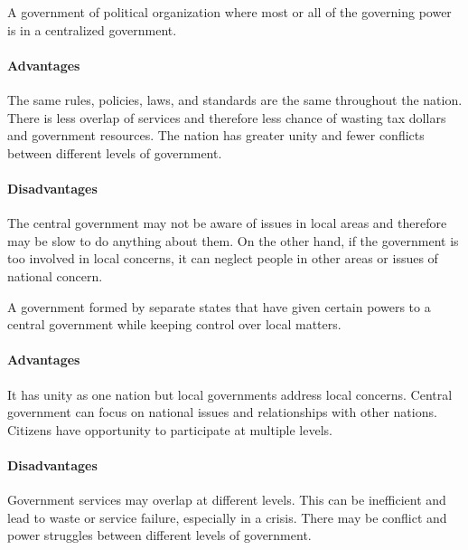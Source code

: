 \begin{definition}[Unitary]
  A government of political organization where most or all of the governing
  power is in a centralized government.

  \paragraph{Advantages} The same rules, policies, laws, and standards are the
  same throughout the nation. There is less overlap of services and therefore
  less chance of wasting tax dollars and government resources. The nation has
  greater unity and fewer conflicts between different levels of government.

  \paragraph{Disadvantages} The central government may not be aware of issues in
  local areas and therefore may be slow to do anything about them. On the other
  hand, if the government is too involved in local concerns, it can neglect
  people in other areas or issues of national concern.
\end{definition}

\begin{definition}[Federation]
  A government formed by separate states that have given certain powers to a
  central government while keeping control over local matters.

  \paragraph{Advantages} It has unity as one nation but local governments
  address local concerns. Central government can focus on national issues and
  relationships with other nations. Citizens have opportunity to participate at
  multiple levels.

  \paragraph{Disadvantages} Government services may overlap at different levels.
  This can be inefficient and lead to waste or service failure, especially in a
  crisis. There may be conflict and power struggles between different levels of
  government.
\end{definition}


